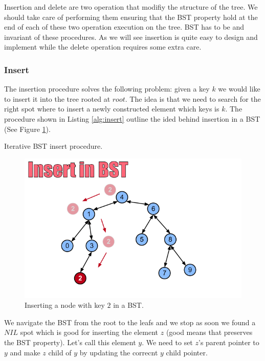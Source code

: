 Insertion and delete are two operation that modifiy the structure of the tree. We should take care of performing them ensuring that the BST property hold at the end of each of these two operation execution on the tree. BST has to be and invariant of these procedures.
As we will see insertion is quite easy to design and implement while the delete operation requires some extra care.
\subsubsection{Insert}
The insertion procedure solves the following problem: given a key $k$ we would like to insert it into the tree rooted at $root$. 
The idea is that we need to search for the right spot where to insert  a newly constructed element which keys is $k$. 
The procedure shown in Listing \ref{alg:insert} outline the ided behind insertion in a BST (See Figure \ref{fig:insertion}).
\begin{algorithm}
\caption{Iterative BST insert procedure.}\label{alg:insert}
\end{algorithm}

\begin{figure}
	\label{fig:insertion}
	\centering
		\includegraphics[scale=0.7]{../images/bstinsert}
		\caption{Inserting a node with key $2$ in a BST.}
	\end{figure}

We navigate the BST from the root to the leafs and we stop as soon we found a $NIL$ spot which is good for inserting the element $z$ (good means that preserves the BST property).
Let's call this element $y$. We need to set $z$'s parent pointer to $y$ and make $z$ child of $y$ by updating the correcnt $y$ child pointer.


